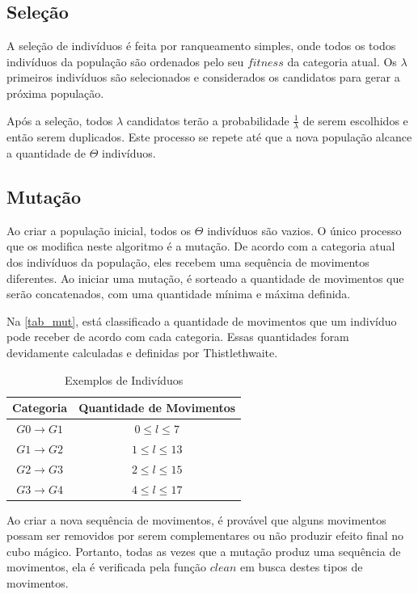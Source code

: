 \documentclass[12pt]{article}
\begin{document}
  \subsection{Seleção}
    A seleção de indivíduos é feita por ranqueamento simples, onde todos os todos indivíduos da população são ordenados pelo seu $fitness$ da categoria atual. Os $\lambda$ primeiros indivíduos são selecionados e considerados os candidatos para gerar a próxima população.

    Após a seleção, todos $\lambda$ candidatos terão a probabilidade $\frac{1}{\lambda}$ de serem escolhidos e então serem duplicados. Este processo se repete até que a nova população alcance a quantidade de $\Theta$ indivíduos.

  \subsection{Mutação}
    Ao criar a população inicial, todos os $\Theta$ indivíduos são vazios. O único processo que os modifica neste algoritmo é a mutação. De acordo com a categoria atual dos indivíduos da população, eles recebem uma sequência de movimentos diferentes. Ao iniciar uma mutação, é sorteado a quantidade de movimentos que serão concatenados, com uma quantidade mínima e máxima definida.

    Na \autoref{tab_mut}, está classificado a quantidade de movimentos que um indivíduo pode receber de acordo com cada categoria. Essas quantidades foram devidamente calculadas e definidas por Thistlethwaite.

    \begin{table}[ht]
      \centering
      \caption{Exemplos de Indivíduos} \label{tab_mut}
      \begin{tabular}{|c|c|}
        \hline
        \textbf{Categoria} & \textbf{Quantidade de Movimentos}  \\ \hline
            $G0\to G1$     &  $0 \leq l \leq 7$                 \\ \hline
            $G1\to G2$     &  $1 \leq l \leq 13$                \\ \hline
            $G2\to G3$     &  $2 \leq l \leq 15$                \\ \hline
            $G3\to G4$     &  $4 \leq l \leq 17$                \\ \hline
      \end{tabular}
    \end{table}

    Ao criar a nova sequência de movimentos, é provável que alguns movimentos possam ser removidos por serem complementares ou não produzir efeito final no cubo mágico. Portanto, todas as vezes que a mutação produz uma sequência de movimentos, ela é verificada pela função $clean$ em busca destes tipos de movimentos.
\end{document}
